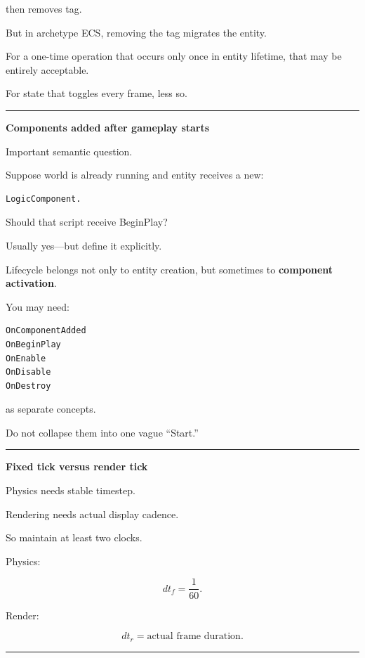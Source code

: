 then removes tag.

But in archetype ECS, removing the tag migrates the entity.

For a one-time operation that occurs only once in entity lifetime, that may be entirely acceptable.

For state that toggles every frame, less so.

\begin{center}\rule{0.5\linewidth}{0.5pt}\end{center}

\textbf{Components added after gameplay starts}

Important semantic question.

Suppose world is already running and entity receives a new:

\begin{verbatim}
LogicComponent.
\end{verbatim}

Should that script receive BeginPlay?

Usually yes---but define it explicitly.

Lifecycle belongs not only to entity creation, but sometimes to \textbf{component activation}.

You may need:

\begin{verbatim}
OnComponentAdded
OnBeginPlay
OnEnable
OnDisable
OnDestroy
\end{verbatim}

as separate concepts.

Do not collapse them into one vague ``Start.''

\begin{center}\rule{0.5\linewidth}{0.5pt}\end{center}

\textbf{Fixed tick versus render tick}

Physics needs stable timestep.

Rendering needs actual display cadence.

So maintain at least two clocks.

Physics:

\[
dt_f=\frac{1}{60}.
\]

Render:

\[
dt_r=
\text{actual frame duration}.
\]

\begin{center}\rule{0.5\linewidth}{0.5pt}\end{center}

